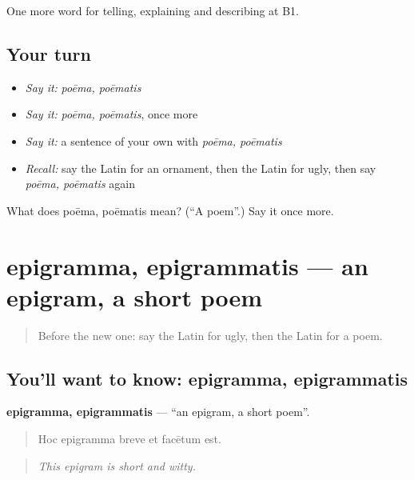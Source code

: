 \begin{grammarlens}[title={What you've built}]
One more word for telling, explaining and describing at B1.
\end{grammarlens}

\subsection*{Your turn}
\begin{itemize}
\raggedright
  \item \emph{Say it:} \emph{poēma, poēmatis}
  \item \emph{Say it:} \emph{poēma, poēmatis}, once more
  \item \emph{Say it:} a sentence of your own with \emph{poēma, poēmatis}
  \item \emph{Recall:} say the Latin for an ornament, then the Latin for ugly, then say \emph{poēma, poēmatis} again
\end{itemize}

\begin{tcolorbox}[breakable,colback=teal!4,colframe=teal!35!black,title={Before you move on}]
What does poēma, poēmatis mean? (\textquotedblleft{}A poem\textquotedblright{}.) Say it once more.
\end{tcolorbox}
\section[epigramma, epigrammatis]{epigramma, epigrammatis — an epigram, a short poem}

\label{lesson:LA-C549-epigramma}



\begin{quote}
Before the new one: say the Latin for ugly, then the Latin for a poem.
\end{quote}

\subsection*{You'll want to know: epigramma, epigrammatis}
\textbf{epigramma, epigrammatis} — \textquotedblleft{}an epigram, a short poem\textquotedblright{}.

\begin{quote}
Hoc epigramma breve et facētum est.
\end{quote}

\begin{quote}
\emph{This epigram is short and witty.}
\end{quote}

